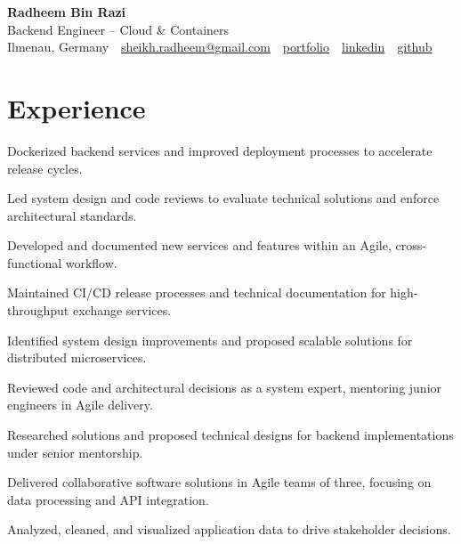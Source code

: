 \documentclass[11pt,a4paper]{resume}
\makeatletter
\newcommand{\Portfolio}{https://radheem.github.io/my-cv}
\newcommand{\PortfolioText}{portfolio}
\newcommand{\GitHub}{https://github.com/radheem}
\newcommand{\LinkedIn}{https://www.linkedin.com/in/radheem-razi}
\newcommand{\Email}{sheikh.radheem@gmail.com}
\makeatother
\begin{document}
\begin{center}
  {\huge\bfseries Radheem Bin Razi}\\[3pt]
  {\large Backend Engineer – Cloud \& Containers}\\[6pt]
  \small
  Ilmenau, Germany \,\textbar\,
  \href{mailto:\Email}{\Email} \,\textbar\,
  \href{\Portfolio}{\PortfolioText} \,\textbar\,
  \href{\LinkedIn}{linkedin} \,\textbar\,
  \href{\GitHub}{github}
\end{center}
\vspace{2pt}

\section{Experience}

\bullets
  \item Dockerized backend services and improved deployment processes to accelerate release cycles.
  \item Led system design and code reviews to evaluate technical solutions and enforce architectural standards.
  \item Developed and documented new services and features within an Agile, cross-functional workflow.
\bulletsend
\vspace{3pt}
\bullets
  \item Maintained CI/CD release processes and technical documentation for high-throughput exchange services.
  \item Identified system design improvements and proposed scalable solutions for distributed microservices.
  \item Reviewed code and architectural decisions as a system expert, mentoring junior engineers in Agile delivery.
\bulletsend
\vspace{3pt}
\bullets
  \item Researched solutions and proposed technical designs for backend implementations under senior mentorship.
  \item Delivered collaborative software solutions in Agile teams of three, focusing on data processing and API integration.
  \item Analyzed, cleaned, and visualized application data to drive stakeholder decisions.
\bulletsend
\vspace{3pt}
\end{document}
